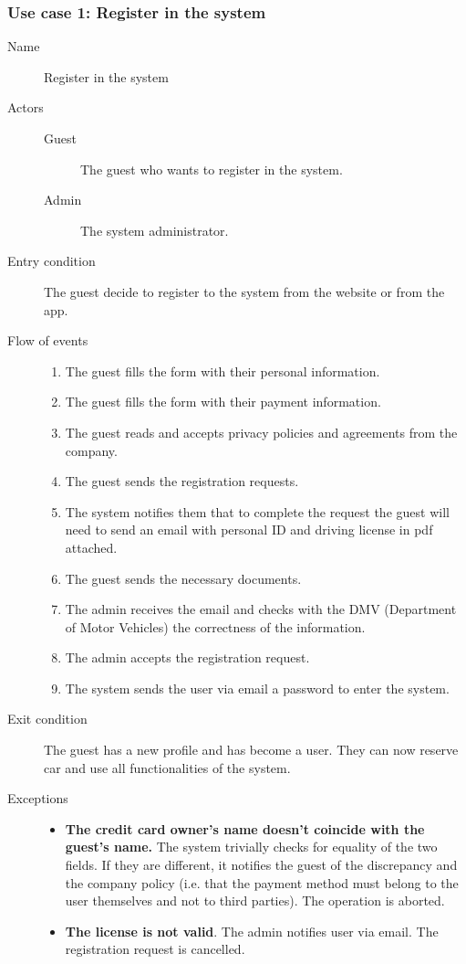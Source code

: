 	\subsubsection{Use case 1: Register in the system}
		\begin{description}
			\item[Name] Register in the system
			\item[Actors] \hfill
				\begin{description}
					\item[Guest] The guest who wants to register in the system.
					\item[Admin] The system administrator.
				\end{description}
			\item[Entry condition] The guest decide to register to the system from the website or from the app.
			\item[Flow of events] \hfill
				\begin{enumerate}
					\item The guest fills the form with their personal information.
					\item The guest fills the form with their payment information. 
					\item The guest reads and accepts privacy policies and agreements from the company.
					\item The guest sends the registration requests.
					\item The system notifies them that to complete the request the guest will need to send an email with personal ID and driving license in pdf attached.
					\item The guest sends the necessary documents.
					\item The admin receives the email and checks with the DMV (Department of Motor Vehicles) the correctness of the information.
					\item The admin accepts the registration request.
					\item The system sends the user via email a password to enter the system.
				\end{enumerate}
			\item[Exit condition] The guest has a new profile and has become a user. They can now reserve car and use all functionalities of the system.
			\item[Exceptions] \hfill
				\begin{itemize}
					\item \textbf{The credit card owner's name doesn't coincide with the guest's name.} The system trivially checks for equality of the two fields. If they are different, it notifies the guest of the discrepancy and the company policy (i.e. that the payment method must belong to the user themselves and not to third parties). The operation is aborted.
					\item \textbf{The license is not valid}. The admin notifies user via email. The registration request is cancelled.
				\end{itemize}
		\end{description}			
	
